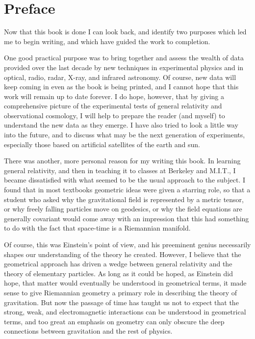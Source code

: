 
\clearpage
\section*{Preface}

Now that this book is done I can look back, and identify two purposes which
led me to begin writing, and which have guided the work to completion.

One good practical purpose was to bring together and assess the wealth of data
provided over the last decade by new techniques in experimental physics and in
optical, radio, radar, X-ray, and infrared astronomy. Of course, new data will
keep coming in even as the book is being printed, and I cannot hope that this
work will remain up to date forever. I do hope, however, that by giving a
comprehensive picture of the experimental tests of general relativity and
observational cosmology, I will help to prepare the reader (and myself) to
understand the new data as they emerge. I have also tried to look a little way
into the future, and to discuss what may be the next generation of experiments,
especially those based on artificial satellites of the earth and sun.

There was another, more personal reason for my writing this book. In learning
general relativity, and then in teaching it to classes at Berkeley and M.I.T., I
became dissatisfied with what seemed to be the usual approach to the subject. I
found that in most textbooks geometric ideas were given a starring role, so
that a student who asked why the gravitational field is represented by a metric
tensor, or why freely falling particles move on geodesics, or why the field
equations are generally covariant would come away with an impression that this
had something to do with the fact that space-time is a Riemannian manifold.

Of course, this was Einstein's point of view, and his preeminent genius
necessarily shapes our understanding of the theory he created. However, I
believe that the geometrical approach has driven a wedge between general
relativity and the theory of elementary particles. As long as it could be
hoped, as Einstein did hope, that matter would eventually be understood in
geometrical terms, it made sense to give Riemannian geometry a primary role in
describing the theory of gravitation. But now the passage of time has taught us
not to expect that the strong, weak, and electromagnetic interactions can be
understood in geometrical terms, and too great an emphasis on geometry can only
obscure the deep connections between gravitation and the rest of physics.

